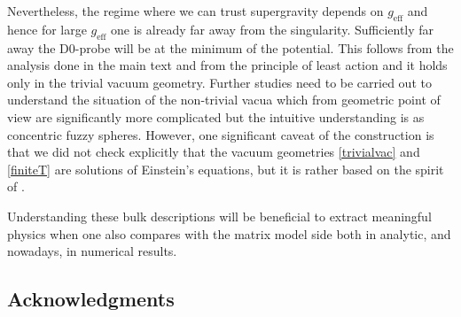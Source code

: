 \documentclass[11pt,english]{article}
\numberwithin{equation}{section}
\begin{document}
 Nevertheless, the regime where we can trust supergravity depends on $g_{\text{eff}}$ and hence for large $g_{\text{eff}}$ one is already far away from the singularity. Sufficiently far away the D0-probe will be at the minimum of the potential. This follows from the analysis done in the main text and from the principle of least action and it holds only in the trivial vacuum geometry. Further studies need to be carried out to understand the situation of the non-trivial vacua which from geometric point of view are significantly more complicated but the intuitive understanding is as concentric fuzzy spheres.  However, one significant caveat of the construction is that we did not check explicitly that the vacuum geometries \eqref{trivialvac} and \eqref{finiteT} are solutions of Einstein's equations, but it is rather based on the spirit of \cite{Lin2006}.
 
 
  Understanding these bulk descriptions will be beneficial to extract meaningful physics when one also compares with the matrix model side both in analytic, and nowadays,  in numerical results.      
  
 \subsection*{Acknowledgments}

  
  
 
\nocite{}


\end{document}
